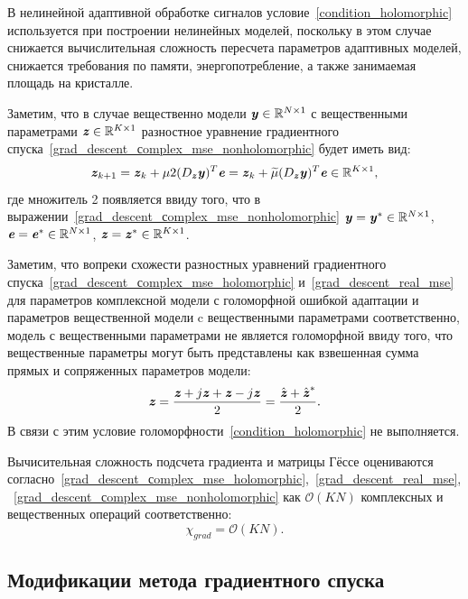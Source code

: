 В нелинейной адаптивной обработке сигналов условие~\eqref{condition_holomorphic} используется при построении нелинейных моделей, поскольку в этом случае снижается вычислительная сложность пересчета параметров адаптивных моделей, снижается требования по памяти, энергопотребление, а также занимаемая площадь на кристалле.

Заметим, что в случае вещественно модели $\textbf{\textit{y}}\in\mathbb{R}^{N\times1}$ с вещественными параметрами $\textbf{\textit{z}}\in\mathbb{R}^{K\times1}$ разностное уравнение градиентного спуска~\eqref{grad_descent_сomplex_mse_nonholomorphic} будет иметь вид:
\begin{equation}
	\textbf{\textit{z}}_{k+1}=\textbf{\textit{z}}_{k}+\mu2(D_{\textbf{\textit{z}}}\textbf{\textit{y}})^T\textbf{\textit{e}}=\textbf{\textit{z}}_{k}+\widetilde{\mu}(D_{\textbf{\textit{z}}}\textbf{\textit{y}})^T\textbf{\textit{e}}\in\mathbb{R}^{K\times1},
	\label{grad_descent_real_mse}
\end{equation}
где множитель 2 появляется ввиду того, что в выражении~\eqref{grad_descent_сomplex_mse_nonholomorphic} $\textbf{\textit{y}}=\textbf{\textit{y}}^*\in\mathbb{R}^{N\times1}$, $\textbf{\textit{e}}=\textbf{\textit{e}}^*\in\mathbb{R}^{N\times1}$, $\textbf{\textit{z}}=\textbf{\textit{z}}^*\in\mathbb{R}^{K\times1}$.

Заметим, что вопреки схожести разностных уравнений градиентного спуска~\eqref{grad_descent_сomplex_mse_holomorphic} и~\eqref{grad_descent_real_mse} для параметров комплексной модели с голоморфной ошибкой адаптации и параметров вещественной модели c вещественными параметрами соответственно, модель с вещественными параметрами не является голоморфной ввиду того, что вещественные параметры могут быть представлены как взвешенная сумма прямых и сопряженных параметров модели:
\begin{equation}
	\textbf{\textit{z}}=\frac{\textbf{\textit{z}}+j\textbf{\textit{z}}+\textbf{\textit{z}}-j\textbf{\textit{z}}}{2}=\frac{\hat{\textbf{\textit{z}}}+\hat{\textbf{\textit{z}}}^*}{2}.
	\label{real_param_through_complex}
\end{equation}
В связи с этим условие голоморфности~\eqref{condition_holomorphic} не выполняется.

Вычисительная сложность подсчета градиента и матрицы Гёссе оцениваются согласно~\eqref{grad_descent_сomplex_mse_holomorphic},~\eqref{grad_descent_real_mse},~\eqref{grad_descent_сomplex_mse_nonholomorphic} как $\mathcal{O}(KN)$ комплексных и вещественных операций соответственно:
\begin{equation}
	\chi_{grad}=\mathcal{O}(KN).
	\label{complexity_grad}
\end{equation}

\subsection{Модификации метода градиентного спуска} \label{subsec:grad_modified}

